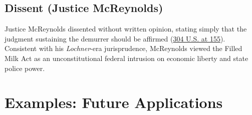 \documentclass[12pt]{article}
\begin{document}
\subsection{Dissent (Justice McReynolds)}

Justice McReynolds dissented without written opinion, stating simply that the judgment sustaining the demurrer should be affirmed (\href{https://supreme.justia.com/cases/federal/us/304/144/}{304 U.S. at 155}). Consistent with his \textit{Lochner}-era jurisprudence, McReynolds viewed the Filled Milk Act as an unconstitutional federal intrusion on economic liberty and state police power.

\section{Examples: Future Applications}
\end{document}
